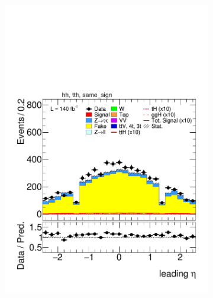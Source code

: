 \begin{figure}[htbp]
\begin{subfigure}[b]{0.45\textwidth}
      \includegraphics[width=\textwidth]{images/fakes_run2/plot_tau_0_eta_hh_tth_15_16_17_18_same_sign.pdf}
      \caption{}
    \end{subfigure}


\end{figure}
